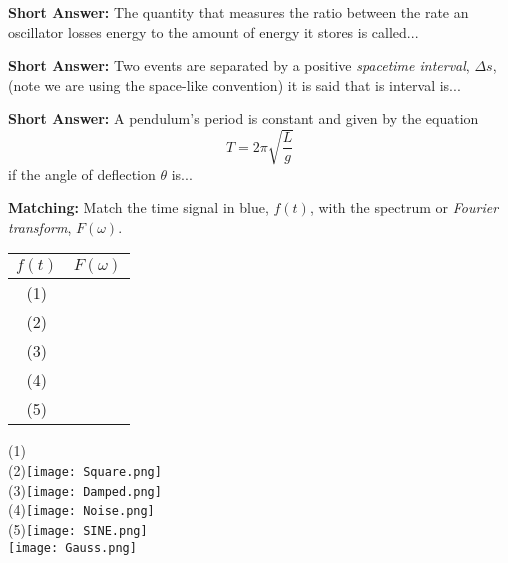 \documentclass[11pt]{exam}
\begin{document}
\begin{questions}
\addpoints
\question[2]\textbf{Short Answer:} The quantity that measures the ratio between the rate an oscillator losses energy to the amount of energy it stores is called...
\vspace{1in}

\addpoints
\question[5]\textbf{Short Answer:} Two events are separated by a positive \emph{spacetime interval}, $\Delta s$, (note we are using the space-like convention) it is said that is interval is...
\vspace{1in}

\addpoints
\question[5]\textbf{Short Answer:} A pendulum's period is constant and given by the equation
$$T=2\pi\sqrt{\frac{L}{g}}$$
if the angle of deflection $\theta$ is...
\vspace{1in}

\newpage
\addpoints
\question[5]\textbf{Matching:} Match the time signal in blue, $f(t)$, with the spectrum or \emph{Fourier transform}, $F(\omega)$.
\Large
\begin{center}
\begin{tabular}{|c|c|}
\hline
$f(t)$     &$F(\omega)$\\
\hline
(1)          &\hspace*{1in}\\
\hline
(2)          &\hspace*{1in}\\
\hline
(3)          &\hspace*{1in}\\
\hline
(4)          &\hspace*{1in}\\
\hline
(5)          &\hspace*{1in}\\
\hline
\end{tabular}
\end{center}

\normalsize
\begin{multicols}{2} 
(1)\\
(2)\texttt{[image: Square.png]}\\
(3)\texttt{[image: Damped.png]}\\
(4)\texttt{[image: Noise.png]}\\
(5)\texttt{[image: SINE.png]}\\
\hspace*{0.18in}\texttt{[image: Gauss.png]}\\


\end{multicols}
\end{questions}
\end{document}

